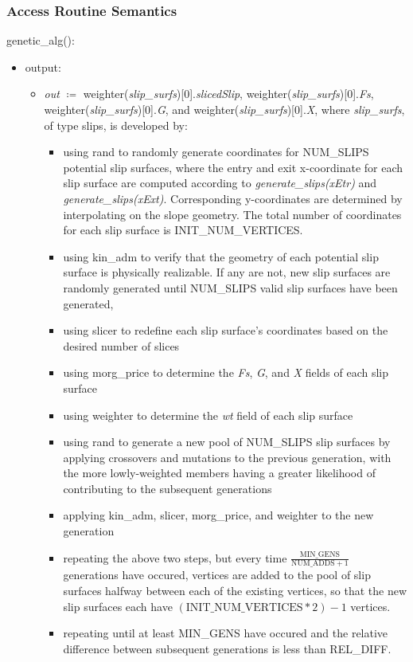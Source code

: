 \documentclass[12pt, titlepage]{article}
\begin{document}
\subsubsection{Access Routine Semantics}
genetic\_alg():
\begin{itemize}
	\item output:
	\begin{itemize}
	\item[] \textit{out} $\coloneqq$ 
	weighter(\textit{slip\_surfs})[0].\textit{slicedSlip}, 
	weighter(\textit{slip\_surfs})[0].\textit{Fs}, 
	weighter(\textit{slip\_surfs})[0].\textit{G}, 
	and weighter(\textit{slip\_surfs})[0].\textit{X}, where 
	\textit{slip\_surfs}, of 
	type slips, is developed by:
	\begin{itemize}
		\item using rand to randomly generate coordinates for NUM\_SLIPS 
		potential slip surfaces, where the entry and exit x-coordinate for each 
		slip surface are computed according to \textit{generate\_slips(xEtr)} 
		and \textit{generate\_slips(xExt)}. Corresponding y-coordinates are 
		determined by interpolating on the slope geometry. The total number of 
		coordinates for each slip surface is INIT\_NUM\_VERTICES.
		\item using kin\_adm to verify that the geometry of each potential slip 
		surface is physically realizable. If any are not, new slip surfaces are 
		randomly generated until NUM\_SLIPS valid slip surfaces have been 
		generated,
		\item using slicer to redefine each slip surface's coordinates based on 
		the desired number of slices
		\item using morg\_price to determine the \textit{Fs}, \textit{G}, and 
		\textit{X} fields of each slip 
		surface
		\item using weighter to determine the \textit{wt} field of each 
		slip surface
		\item using rand to generate a new pool of NUM\_SLIPS slip surfaces by 
		applying crossovers and mutations to the previous generation, with the 
		more lowly-weighted members having a greater likelihood of 
		contributing to the subsequent generations
		\item applying kin\_adm, slicer, morg\_price, and weighter to the new 
		generation
		\item repeating the above two steps, but every time 
		$\frac{\text{MIN\_GENS}}{\text{NUM\_ADDS}+1}$ generations have occured, 
		vertices are added to the pool of slip surfaces halfway between each of 
		the existing vertices, so that the new slip surfaces each have 
		$(\text{INIT\_NUM\_VERTICES} * 2) - 1$ vertices. 
		\item repeating until at least MIN\_GENS have occured and the relative 
		difference between subsequent generations is less than REL\_DIFF.
	\end{itemize}
	\end{itemize}
\end{itemize}
\end{document}
